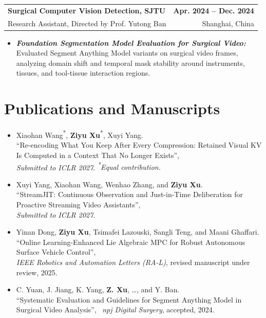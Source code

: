 \documentclass[11pt,letterpaper]{article}
\makeatletter
\newcommand{\resumeSubheading}[4]{
    \begin{tabularx}{\textwidth}{@{}Xr@{}}
        \textbf{#1} & \textbf{#2} \\
        #3 & #4 \\
    \end{tabularx}
}
\newcommand{\resumeItem}[1]{
    \item #1
}
\makeatother
\begin{document}
\resumeSubheading
{Surgical Computer Vision Detection, SJTU}
{Apr. 2024 -- Dec. 2024}
{Research Assistant, Directed by Prof. Yutong Ban}
{Shanghai, China}
\begin{itemize}[leftmargin=2.4em, itemsep=0.5pt, topsep=0pt]
    \small
    \resumeItem{\textbf{\textit{Foundation Segmentation Model Evaluation for Surgical Video:}} Evaluated Segment Anything Model variants on surgical video frames, analyzing domain shift and temporal mask stability around instruments, tissues, and tool-tissue interaction regions.}
\end{itemize}

\section*{Publications and Manuscripts}

\begin{itemize}[leftmargin=1.4em, itemsep=3pt, topsep=2pt]
    \item Xiaohan Wang\textsuperscript{*}, \textbf{Ziyu Xu}\textsuperscript{*}, Xuyi Yang. \\
    ``Re-encoding What You Keep After Every Compression: Retained Visual KV Is Computed in a Context That No Longer Exists'', \\
    \textit{Submitted to ICLR 2027}. \textit{\textsuperscript{*}Equal contribution.}
    \item Xuyi Yang, Xiaohan Wang, Wenhao Zhang, and \textbf{Ziyu Xu}. \\
    ``StreamJIT: Continuous Observation and Just-in-Time Deliberation for Proactive Streaming Video Assistants'', \\
    \textit{Submitted to ICLR 2027}.
    \item Yinan Dong, \textbf{Ziyu Xu}, Tsimafei Lazouski, Sangli Teng, and Maani Ghaffari. \\
    ``Online Learning-Enhanced Lie Algebraic MPC for Robust Autonomous Surface Vehicle Control'', \\
    \textit{IEEE Robotics and Automation Letters (RA-L)}, revised manuscript under review, 2025.
    \item C. Yuan, J. Jiang, K. Yang, \textbf{Z. Xu}, \ldots, and Y. Ban. \\
    ``Systematic Evaluation and Guidelines for Segment Anything Model in Surgical Video Analysis'', \
    \textit{npj Digital Surgery}, accepted, 2024.
    
\end{itemize}
\end{document}
